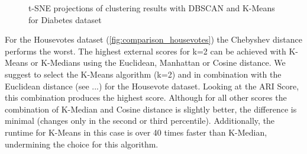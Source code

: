 \begin{figure}[H]
	\caption{t-SNE projections of clustering results with DBSCAN and K-Means for Diabetes dataset}
	\label{fig:diabetestsne}
\end{figure}
 

For the Housevotes dataset (\autoref{fig:comparison_housevotes}) the Chebyshev distance performs the worst. The highest external scores for k=2 can be achieved with K-Means or K-Medians using the Euclidean, Manhattan or Cosine distance. We suggest to select the K-Means algorithm (k=2) and in combination with the Euclidean distance (see ...) for the Housevote dataset. Looking at the ARI Score, this combination produces the highest score. Although for all other scores the combination of K-Median and Cosine distance is slightly better, the difference is minimal (changes only in the second or third percentile). Additionally, the runtime for K-Means in this case is over 40 times faster than K-Median, undermining the choice for this algorithm.



